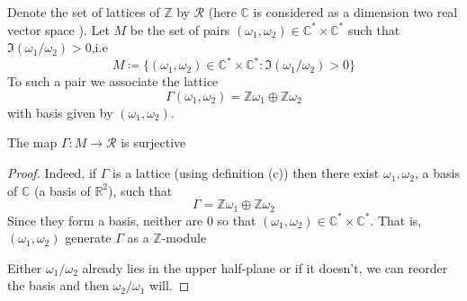 \documentclass[12pt]{article}
\theoremstyle{definition}
\begin{document}
Denote the set of lattices of \(\mathbb{Z} \)  by \(\mathscr{R} \) (here \(\mathbb{C} \) is considered as a dimension two real vector space ). Let \(M\) be the set of pairs \((\omega_1, \omega _2) \in \mathbb{C} ^{\ast} \times \mathbb{C} ^{\ast} \) such that \(\Im(\omega _1/\omega _2)>0\),i.e
\[
    M \coloneqq \{ (\omega _1,\omega _2)\in \mathbb{C} ^{\ast} \times \mathbb{C} ^{\ast} : \Im (\omega_1/\omega _2)>0 \} 
\] To such a pair we associate the lattice
\[
    \Gamma (\omega _1,\omega _2) = \mathbb{Z} \omega _1 \oplus \mathbb{Z} \omega _2
\]  
with basis given by \((\omega_1,\omega _2)\). 

\begin{claim}
    The map \(\Gamma : M \to \mathscr{R} \) is surjective 
\end{claim}
\begin{proof}
    Indeed, if \(\Gamma \) is a lattice (using definition (c)) then there exist \(\omega _1,\omega _2\), a basis of \(\mathbb{C} \) (a basis of \(\mathbb{R} ^2\)), such that \[\Gamma = \mathbb{Z} \omega _1\oplus \mathbb{Z} \omega _2\] Since they form a basis, neither are \(0\) so that \((\omega_1,\omega _2) \in\mathbb{C} ^{\ast} \times \mathbb{C} ^{\ast}  \). That is, \((\omega _1,\omega _2)\) generate \(\Gamma \) as a \(\mathbb{Z} \)-module       

    Either \(\omega_1/\omega _2\) already lies in the upper half-plane or if it doesn't, we can reorder the basis and then \(\omega_2/\omega_1\) will.   
\end{proof}
\end{document}
